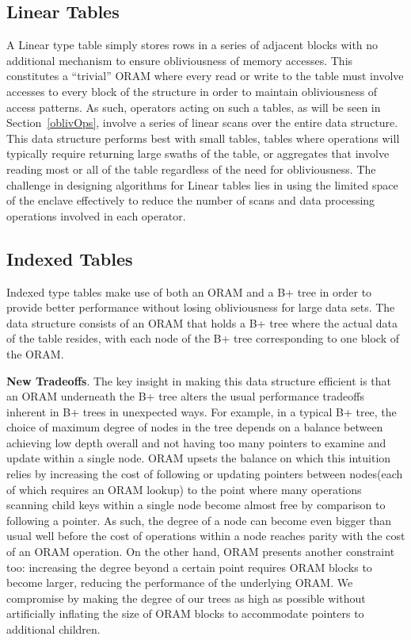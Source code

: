 \documentclass[letterpaper,twocolumn,10pt]{article}
\begin{document}
\subsection{Linear Tables}
A Linear type table simply stores rows in a series of adjacent blocks with no additional mechanism to ensure obliviousness of memory accesses. This constitutes a ``trivial'' ORAM where every read or write to the table must involve accesses to every block of the structure in order to maintain obliviousness of access patterns. As such, operators acting on such a tables, as will be seen in Section~\ref{oblivOps}, involve a series of linear scans over the entire data structure. This data structure performs best with small tables, tables where operations will typically require returning large swaths of the table, or aggregates that involve reading most or all of the table regardless of the need for obliviousness. The challenge in designing algorithms for Linear tables lies in using the limited space of the enclave effectively to reduce the number of scans and data processing operations involved in each operator.

\subsection{Indexed Tables}
Indexed type tables make use of both an ORAM and a B+ tree in order to provide better performance without losing obliviousness for large data sets. The data structure consists of an ORAM that holds a B+ tree where the actual data of the table resides, with each node of the B+ tree corresponding to one block of the ORAM.

\noindent \textbf{New Tradeoffs}. The key insight in making this data structure efficient is that an ORAM underneath the B+ tree alters the usual performance tradeoffs inherent in B+ trees in unexpected ways. For example, in a typical B+ tree, the choice of maximum degree of nodes in the tree depends on a balance between achieving low depth overall and not having too many pointers to examine and update within a single node. ORAM upsets the balance on which this intuition relies by increasing the cost of following or updating pointers between nodes(each of which requires an ORAM lookup) to the point where many operations scanning child keys within a single node become almost free by comparison to following a pointer. As such, the degree of a node can become even bigger than usual well before the cost of operations within a node reaches parity with the cost of an ORAM operation. On the other hand, ORAM presents another constraint too: increasing the degree beyond a certain point requires ORAM blocks to become larger, reducing the performance of the underlying ORAM. We compromise by making the degree of our trees as high as possible without artificially inflating the size of ORAM blocks to accommodate pointers to additional children.
\end{document}
